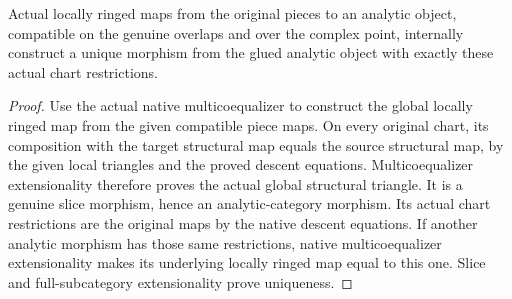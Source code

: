 \begin{theorem}
\label{hir:reduced-analytic-glue-effective-map-descent}
Actual locally ringed maps from the original pieces to an analytic
object, compatible on the genuine overlaps and over the complex point,
internally construct a unique morphism from the glued analytic object
with exactly these actual chart restrictions.
\leanok
\end{theorem}
\begin{proof}
Use the actual native multicoequalizer to construct the global locally
ringed map from the given compatible piece maps. On every original
chart, its composition with the target structural map equals the
source structural map, by the given local triangles and the proved
descent equations. Multicoequalizer extensionality therefore proves
the actual global structural triangle. It is a genuine slice morphism,
hence an analytic-category morphism. Its actual chart restrictions
are the original maps by the native descent equations. If another
analytic morphism has those same restrictions, native multicoequalizer
extensionality makes its underlying locally ringed map equal to this
one. Slice and full-subcategory extensionality prove uniqueness.
\end{proof}

